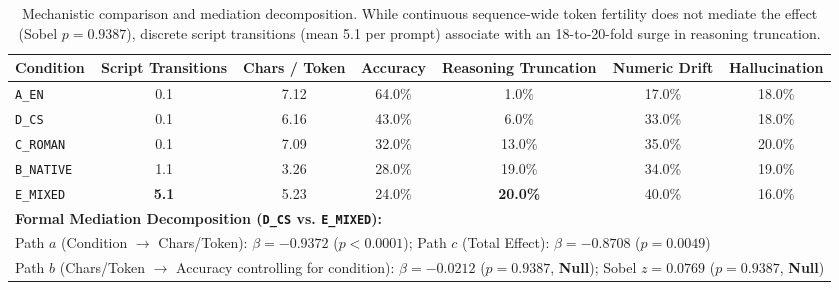 \begin{table}[t]
\centering
\small
\begin{tabular}{lcccccc}
\toprule
\textbf{Condition} & \textbf{Script Transitions} & \textbf{Chars / Token} & \textbf{Accuracy} & \textbf{Reasoning Truncation} & \textbf{Numeric Drift} & \textbf{Hallucination} \\
\midrule
\texttt{A\_EN} & 0.1 & 7.12 & 64.0\% & 1.0\% & 17.0\% & 18.0\% \\
\texttt{D\_CS} & 0.1 & 6.16 & 43.0\% & 6.0\% & 33.0\% & 18.0\% \\
\texttt{C\_ROMAN} & 0.1 & 7.09 & 32.0\% & 13.0\% & 35.0\% & 20.0\% \\
\texttt{B\_NATIVE} & 1.1 & 3.26 & 28.0\% & 19.0\% & 34.0\% & 19.0\% \\
\texttt{E\_MIXED} & \textbf{5.1} & 5.23 & 24.0\% & \textbf{20.0\%} & 40.0\% & 16.0\% \\
\midrule
\multicolumn{7}{l}{\textbf{Formal Mediation Decomposition (\texttt{D\_CS} vs. \texttt{E\_MIXED}):}} \\
\multicolumn{7}{l}{Path $a$ (Condition $\to$ Chars/Token): $\beta = -0.9372$ ($p < 0.0001$); Path $c$ (Total Effect): $\beta = -0.8708$ ($p = 0.0049$)} \\
\multicolumn{7}{l}{Path $b$ (Chars/Token $\to$ Accuracy controlling for condition): $\beta = -0.0212$ ($p = 0.9387$, \textbf{Null}); Sobel $z = 0.0769$ ($p = 0.9387$, \textbf{Null})} \\
\bottomrule
\end{tabular}
\caption{Mechanistic comparison and mediation decomposition. While continuous sequence-wide token fertility does not mediate the effect (Sobel $p = 0.9387$), discrete script transitions (mean 5.1 per prompt) associate with an 18-to-20-fold surge in reasoning truncation.}
\label{tab:mechanistic_analysis}
\end{table}
